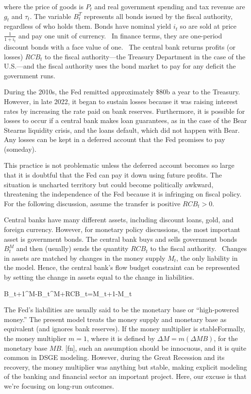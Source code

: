 ﻿\documentclass[oneside]{book}
\begin{document}
where the price of goods is $P_{t}$ and real government spending and tax
revenue are $g_{t}$ and $\tau _{t}$. The variable $B_{t}^{T}$
represents all bonds issued by the fiscal authority, regardless of who holds
them. Bonds have nominal yield $i_{t}$ so are sold at price $\frac{1}{1+i_{t}}$ and pay one unit of currency. \ In
finance terms, they are one-period discount bonds with a face value of one.
\ The central bank returns profits (or losses) $RCB_{t}$ to the fiscal
authority---the Treasury Department in the case of the U.S.---and the fiscal authority uses
the bond market to pay for any deficit the government runs.

During the 2010s, the Fed remitted approximately \$80b a year
to the Treasury. However, in late 2022, it began to sustain losses because it was raising interest rates by increasing the rate paid on bank reserves. Furthermore, it is possible for losses to occur if a central bank makes loan guarantees, as in the case of the Bear Stearns liquidity crisis, and the loans default, which did not happen with Bear. Any losses can be kept in a deferred account that the Fed promises to pay (someday).

This practice is not problematic unless the deferred account becomes so
large that it is doubtful that the Fed can pay it down using future profits. The situation is uncharted territory but could become politically awkward, threatening the independence of the Fed because it is infringing on fiscal policy. For the following discussion, assume the transfer is positive $RCB_{t}>0$.

Central banks have many different assets, including discount loans, gold, and
foreign currency. However, for monetary policy discussions, the most important asset
is government bonds. The central bank buys and sells government bonds $B_{t}^{M}$ and then (usually) sends the quantity $RCB_{t}$ to the fiscal authority. \
Changes in assets are matched by changes in the money supply $M_{t}$, the only liability in the model. Hence, the central bank's flow budget constraint can be
represented by setting the change in assets equal to the change in
liabilities.



B_{t+1}^{M}-B_{t}^{M}+RCB_{t}=M_{t+1}-M_{t}




The Fed's liabilities are usually said to be the monetary
base or ``high-powered money.'' The present model treats the money supply and
monetary base as equivalent (and ignores bank reserves). If the money
multiplier is stableFormally, the money multiplier $m=1$, where it is defined by $\Delta
M=m( \Delta MB) $, for the monetary base $MB$. [fn], such an
assumption should be innocuous, and it is quite common in DSGE modeling.
However, during the Great Recession and its recovery, the money multiplier was
anything but stable, making explicit modeling of the banking and financial
sector an important project. Here, our excuse is that we're focusing on long-run outcomes.
\end{document}
